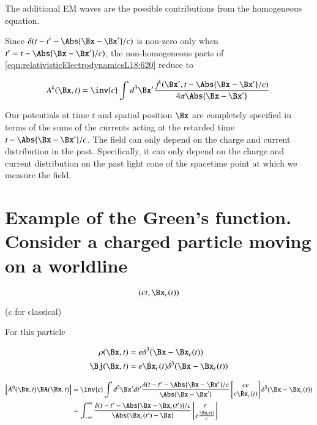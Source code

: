 The additional EM waves are the possible contributions from the homogeneous equation.

Since $\delta(t - t' - \Abs{\Bx -\Bx'}/c)$ is non-zero only when $t' = t - \Abs{\Bx -\Bx'}/c)$, the non-homogeneous parts of \ref{eqn:relativisticElectrodynamicsL18:620} reduce to

\begin{equation}\label{eqn:relativisticElectrodynamicsL18:625}
A^k(\Bx, t) = \inv{c} \int d^3 \Bx' 
\frac{j^k(\Bx', t - \Abs{\Bx - \Bx'}/c)}{4 \pi \Abs{\Bx - \Bx'}}.
\end{equation}

Our potentials at time $t$ and spatial position $\Bx$ are completely specified in terms of the sums of the currents acting at the retarded time $t - \Abs{\Bx - \Bx'}/c$.  The field can only depend on the charge and current distribution in the past.  Specifically, it can only depend on the charge and current distribution on the past light cone of the spacetime point at which we measure the field.

\section{Example of the Green's function.  Consider a charged particle moving on a worldline}

\begin{equation}\label{eqn:relativisticElectrodynamicsL18:150}
(c t, \Bx_c(t))
\end{equation}

($c$ for classical)

For this particle

\begin{align}\label{eqn:relativisticElectrodynamicsL18:170}
\rho(\Bx, t) &= e \delta^3(\Bx - \Bx_c(t)) \\
\Bj(\Bx, t) &= e \dot{\Bx}_c(t) \delta^3(\Bx - \Bx_c(t))
\end{align}

\begin{align*}
\begin{bmatrix}
A^0(\Bx, t)
\BA(\Bx, t)
\end{bmatrix}
&=
\inv{c}
\int d^3 \Bx' dt'
\frac{ \delta( t - t' - \Abs{\Bx - \Bx'}/c }{\Abs{\Bx - \Bx'}}
\begin{bmatrix}
c e \\
e \dot{\Bx}_c(t)
\end{bmatrix}
\delta^3(\Bx - \Bx_c(t)) \\
&=
\int_{-\infty}^\infty
\frac{ \delta( t - t' - \Abs{\Bx - \Bx_c(t')}/c }{\Abs{\Bx_c(t') - \Bx}}
\begin{bmatrix}
e \\
e \frac{\dot{\Bx}_c(t)}{c}
\end{bmatrix}
\end{align*}

